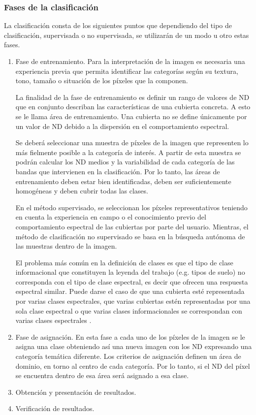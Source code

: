\subsubsection{Fases de la clasificación}
La clasificación consta de los siguientes puntos que dependiendo del tipo de clasificación, supervisada o no supervisada, se utilizarán de un modo u otro estas fases.
\begin{enumerate}
	\item Fase de entrenamiento.
Para la interpretación de la imagen es necesaria una experiencia previa que permita identificar las categorías según su textura, tono, tamaño o situación de los píxeles que la componen.

La finalidad de la fase de entrenamiento es definir un rango de valores de \ac{ND} que en conjunto describan las características de una cubierta concreta. A esto se le llama área de entrenamiento. Una cubierta no se define únicamente por un valor de \ac{ND} debido a la dispersión en el comportamiento espectral.

Se deberá seleccionar una muestra de píxeles de la imagen que representen lo más fielmente posible a la categoría de interés. A partir de esta muestra se podrán calcular los \ac{ND} medios y la variabilidad de cada categoría de las bandas que intervienen en la clasificación. Por lo tanto, las áreas de entrenamiento deben estar bien identificadas, deben ser suficientemente homogéneas y deben cubrir todas las clases.

En el método supervisado, se seleccionan los píxeles representativos teniendo en cuenta la experiencia en campo o el conocimiento previo del comportamiento espectral de las cubiertas por parte del usuario. Mientras, el método de clasificación no supervisado se basa en la búsqueda autónoma de las muestras dentro de la imagen.

El problema más común en la definición de clases es que el tipo de clase informacional que constituyen la leyenda del trabajo (e.g. tipos de suelo) no corresponda con el tipo de clase espectral, es decir que ofrecen una respuesta espectral similar. Puede darse el caso de que una cubierta esté representada por varias clases espectrales, que varias cubiertas estén representadas por una sola clase espectral o que varias clases informacionales se correspondan con varias clases espectrales \citep{chuvieco2002teledeteccion}.

	\item Fase de asignación.
En esta fase a cada uno de los píxeles de la imagen se le asigna una clase obteniendo así una nueva imagen con los \ac{ND} expresando una categoría temática diferente. Los criterios de asignación definen un área de dominio, en torno al centro de cada categoría. Por lo tanto, si el \ac{ND} del píxel se encuentra dentro de esa área será asignado a esa clase.

	\item Obtención y presentación de resultados.
	\item Verificación de resultados.
\end{enumerate}
\Sep

